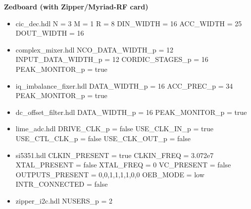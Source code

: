 \documentclass{article}
\begin{document}
\begin{minipage}[t]{.5\textwidth}
	\textbf{Zedboard (with Zipper/Myriad-RF card)}
	\begin{itemize}
		\item cic\_dec.hdl
			\subitem N = 3
			\subitem M = 1
			\subitem R = 8
			\subitem DIN\_WIDTH = 16
			\subitem ACC\_WIDTH = 25
			\subitem DOUT\_WIDTH = 16
		\item complex\_mixer.hdl
			\subitem NCO\_DATA\_WIDTH\_p = 12
			\subitem INPUT\_DATA\_WIDTH\_p = 12
			\subitem CORDIC\_STAGES\_p = 16
			\subitem PEAK\_MONITOR\_p = true
		\item iq\_imbalance\_fixer.hdl
			\subitem DATA\_WIDTH\_p = 16
			\subitem ACC\_PREC\_p = 34
			\subitem PEAK\_MONITOR\_p = true
		\item dc\_offset\_filter.hdl
			\subitem DATA\_WIDTH\_p = 16
			\subitem PEAK\_MONITOR\_p = true
		\item lime\_adc.hdl
			\subitem DRIVE\_CLK\_p = false
			\subitem USE\_CLK\_IN\_p = true
			\subitem USE\_CTL\_CLK\_p = false
			\subitem USE\_CLK\_OUT\_p = false
		\item si5351.hdl
			\subitem CLKIN\_PRESENT = true
			\subitem CLKIN\_FREQ = 3.072e7
			\subitem XTAL\_PRESENT = false
			\subitem XTAL\_FREQ = 0
			\subitem VC\_PRESENT = false
			\subitem OUTPUTS\_PRESENT = 0,0,1,1,1,1,0,0
			\subitem OEB\_MODE = low
			\subitem INTR\_CONNECTED = false
		\item zipper\_i2c.hdl
			\subitem NUSERS\_p = 2
	\end{itemize}
\end{minipage}
\end{document}
